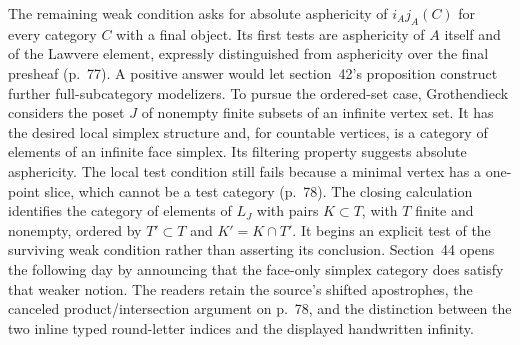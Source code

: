 The remaining weak condition asks for absolute asphericity of $i_Aj_A(C)$ for every category $C$ with a final object. Its first tests are asphericity of $A$ itself and of the Lawvere element, expressly distinguished from asphericity over the final presheaf (p.~77). A positive answer would let section~42's proposition construct further full-subcategory modelizers. To pursue the ordered-set case, Grothendieck considers the poset $J$ of nonempty finite subsets of an infinite vertex set. It has the desired local simplex structure and, for countable vertices, is a category of elements of an infinite face simplex. Its filtering property suggests absolute asphericity. The local test condition still fails because a minimal vertex has a one-point slice, which cannot be a test category (p.~78). The closing calculation identifies the category of elements of $L_J$ with pairs $K\subset T$, with $T$ finite and nonempty, ordered by $T'\subset T$ and $K'=K\cap T'$. It begins an explicit test of the surviving weak condition rather than asserting its conclusion. Section~44 opens the following day by announcing that the face-only simplex category does satisfy that weaker notion. The readers retain the source's shifted apostrophes, the canceled product/intersection argument on p.~78, and the distinction between the two inline typed round-letter indices and the displayed handwritten infinity.

